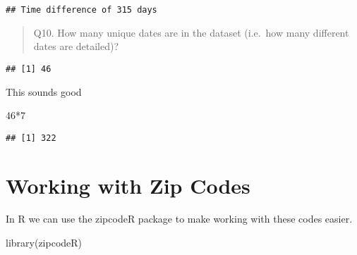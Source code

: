 \documentclass[
]{article}
\newenvironment{Shaded}{\begin{snugshade}}{\end{snugshade}}
\newcommand{\DecValTok}[1]{\textcolor[rgb]{0.00,0.00,0.81}{#1}}
\newcommand{\FunctionTok}[1]{\textcolor[rgb]{0.00,0.00,0.00}{#1}}
\newcommand{\NormalTok}[1]{#1}
\newcommand{\SpecialCharTok}[1]{\textcolor[rgb]{0.00,0.00,0.00}{#1}}
\begin{document}
\begin{Shaded}
\end{Shaded}

\begin{verbatim}
## Time difference of 315 days
\end{verbatim}

\begin{quote}
Q10. How many unique dates are in the dataset (i.e.~how many different
dates are detailed)?
\end{quote}

\begin{Shaded}
\end{Shaded}

\begin{verbatim}
## [1] 46
\end{verbatim}

This sounds good

\begin{Shaded}
\begin{Highlighting}[]
\DecValTok{46}\SpecialCharTok{*}\DecValTok{7}
\end{Highlighting}
\end{Shaded}

\begin{verbatim}
## [1] 322
\end{verbatim}

\hypertarget{working-with-zip-codes}{%
\section{Working with Zip Codes}\label{working-with-zip-codes}}

In R we can use the zipcodeR package to make working with these codes
easier.

\begin{Shaded}
\begin{Highlighting}[]
\FunctionTok{library}\NormalTok{(zipcodeR)}
\end{Highlighting}
\end{Shaded}
\end{document}
